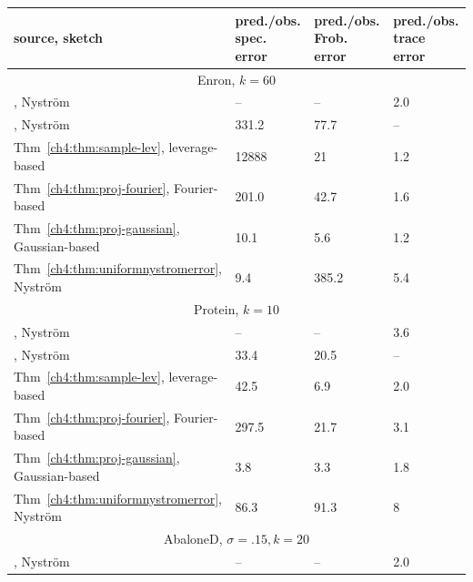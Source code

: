 \begin{table}[!htb]
\centering
\begin{tabular}{|l|p{1in}|p{1in}|p{1in}|}
\hline
source, sketch
 & pred./obs. \linebreak spec. error
 & pred./obs. \linebreak Frob. error
 & pred./obs. \linebreak trace error \\
  \hline
  \multicolumn{4}{|c|}{Enron, $k = 60$ } \\
  \hline
\cite{BW09}, Nystr\"om
 & --  
 & --  
 & 2.0\\
\cite{KMT12}, Nystr\"om
 & 331.2
 & 77.7
 & -- \\
 Thm~\ref{ch4:thm:sample-lev},  leverage-based
 & 12888
 & 21
 & 1.2 \\
Thm~\ref{ch4:thm:proj-fourier}, Fourier-based
 & 201.0
 & 42.7
 & 1.6 \\
Thm~\ref{ch4:thm:proj-gaussian}, Gaussian-based
 & 10.1
 & 5.6
 & 1.2 \\
Thm~\ref{ch4:thm:uniformnystromerror}, Nystr\"om
 & 9.4
 & 385.2
 & 5.4 \\
 \hline
 \multicolumn{4}{|c|}{Protein, $k = 10$ }\\
 \hline
\cite{BW09}, Nystr\"om
 & --  
 & --  
 & 3.6\\
\cite{KMT12}, Nystr\"om
 & 33.4
 & 20.5
 & -- \\
Thm~\ref{ch4:thm:sample-lev},  leverage-based
 & 42.5
 & 6.9
 & 2.0 \\
Thm~\ref{ch4:thm:proj-fourier}, Fourier-based
 & 297.5
 & 21.7
 & 3.1\\
Thm~\ref{ch4:thm:proj-gaussian}, Gaussian-based
 & 3.8
 & 3.3
 & 1.8 \\
Thm~\ref{ch4:thm:uniformnystromerror}, Nystr\"om
 & 86.3
 & 91.3
 & 8 \\
 \hline
 \multicolumn{4}{|c|}{AbaloneD, $\sigma = .15, k = 20$ } \\
 \hline
\cite{BW09}, Nystr\"om
 & --  
 & --  
 & 2.0 \\

\end{tabular}
\end{table}
